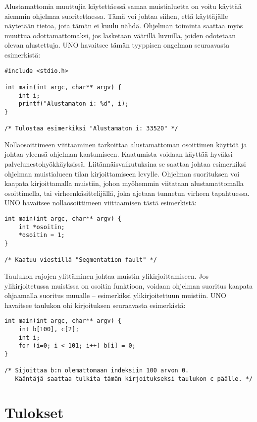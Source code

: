 Alustamattomia muuttujia käytettäessä samaa muistialuetta on voitu käyttää
aiemmin ohjelmaa suoritettaessa. Tämä voi johtaa siihen, että käyttäjälle
näytetään tietoa, jota tämän ei kuulu nähdä. Ohjelman toiminta saattaa myös
muuttua odottamattomaksi, jos lasketaan väärillä luvuilla, joiden odotetaan
olevan alustettuja. UNO havaitsee tämän tyyppisen ongelman seuraavasta
esimerkistä:

\begin{verbatim}
#include <stdio.h>

int main(int argc, char** argv) {
    int i;
    printf("Alustamaton i: %d", i);
}

/* Tulostaa esimerkiksi "Alustamaton i: 33520" */
\end{verbatim}

Nollaosoittimeen viittaaminen tarkoittaa alustamattoman osoittimen käyttöä ja
johtaa yleensä ohjelman kaatumiseen. Kaatumista voidaan käyttää hyväksi
palvelunestohyökkäyksissä. Liitännäisvaikutuksina se saattaa johtaa esimerkiksi
ohjelman muistialueen tilan kirjoittamiseen levylle. Ohjelman suorituksen voi
kaapata kirjoittamalla muistiin, johon myöhemmin viitataan alustamattomalla
osoittimella, tai virheenkäsittelijällä, joka ajetaan tunnetun virheen
tapahtuessa. UNO havaitsee nol\-la\-osoit\-ti\-meen viittaamisen tästä
esimerkistä:

\begin{verbatim}
int main(int argc, char** argv) {
    int *osoitin;
    *osoitin = 1;
}

/* Kaatuu viestillä "Segmentation fault" */
\end{verbatim}

Taulukon rajojen ylittäminen johtaa muistin ylikirjoittamiseen. Jos
ylikirjoitetussa muistissa on osoitin funktioon, voidaan ohjelman suoritus
kaapata ohjaamalla suoritus muualle -- esimerkiksi ylikirjoitettuun muistiin.
UNO havaitsee taulukon ohi kirjoituksen seuraavasta esimerkistä:

\begin{verbatim}
int main(int argc, char** argv) {
    int b[100], c[2];
    int i;
    for (i=0; i < 101; i++) b[i] = 0;
}

/* Sijoittaa b:n olemattomaan indeksiin 100 arvon 0.
   Kääntäjä saattaa tulkita tämän kirjoitukseksi taulukon c päälle. */
\end{verbatim}


\section{Tulokset}
\label{sec:tulos}

